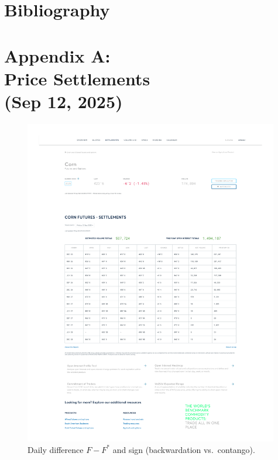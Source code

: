 \documentclass[11pt,a4paper]{article} %
\let\oldsection\section
\renewcommand{\section}{%
    \clearpage
    \thispagestyle{myfancy}%
    \oldsection
  }
\begin{document}
\section{Bibliography}



\section{Appendix A: \\ Price Settlements \\ (Sep 12, 2025)}
\newpage

\begin{figure}[h]
  \centering
  \includegraphics[width=0.99\textwidth]{appendix/CORN12SEP.pdf}
  \caption{Daily difference \(F-F^{*}\) and sign (backwardation vs.\ contango).}
  \label{fig:corn_settlements}
\end{figure}
\end{document}

